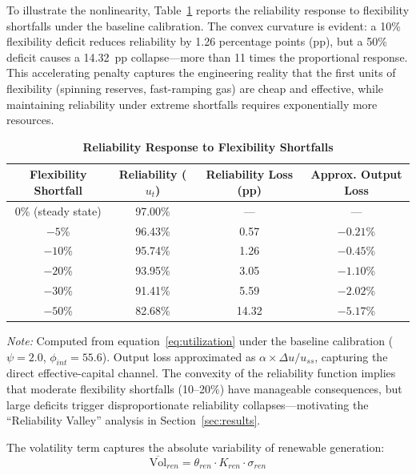 \documentclass[12pt, a4paper]{article}
\begin{document}
To illustrate the nonlinearity, Table~\ref{tab:reliability_numerical} reports the reliability response to flexibility shortfalls under the baseline calibration. The convex curvature is evident: a 10\% flexibility deficit reduces reliability by 1.26 percentage points (pp), but a 50\% deficit causes a 14.32~pp collapse---more than 11 times the proportional response. This accelerating penalty captures the engineering reality that the first units of flexibility (spinning reserves, fast-ramping gas) are cheap and effective, while maintaining reliability under extreme shortfalls requires exponentially more resources.

\begin{table}[H]
    \centering
    \caption{\textbf{Reliability Response to Flexibility Shortfalls}}
    \label{tab:reliability_numerical}
    \renewcommand{\arraystretch}{1.3}
    \small
    \begin{tabular}{c c c c}
        \toprule
        \textbf{Flexibility Shortfall} & \textbf{Reliability ($u_t$)} & \textbf{Reliability Loss (pp)} & \textbf{Approx. Output Loss} \\
        \midrule
        0\% (steady state) & 97.00\% & --- & --- \\
        $-5$\% & 96.43\% & 0.57 & $-0.21$\% \\
        $-10$\% & 95.74\% & 1.26 & $-0.45$\% \\
        $-20$\% & 93.95\% & 3.05 & $-1.10$\% \\
        $-30$\% & 91.41\% & 5.59 & $-2.02$\% \\
        $-50$\% & 82.68\% & 14.32 & $-5.17$\% \\
        \bottomrule
    \end{tabular}
    \parbox{\linewidth}{\footnotesize \textit{Note:} Computed from equation~\eqref{eq:utilization} under the baseline calibration ($\psi = 2.0$, $\phi_{int} = 55.6$). Output loss approximated as $\alpha \times \Delta u / u_{ss}$, capturing the direct effective-capital channel. The convexity of the reliability function implies that moderate flexibility shortfalls (10--20\%) have manageable consequences, but large deficits trigger disproportionate reliability collapses---motivating the ``Reliability Valley'' analysis in Section~\ref{sec:results}.}
\end{table}

The volatility term captures the absolute variability of renewable generation:
\begin{equation}
\overline{\text{Vol}}_{ren} = \theta_{ren} \cdot K_{ren} \cdot \sigma_{ren}
\label{eq:renewable_volatility}
\end{equation}
\end{document}
